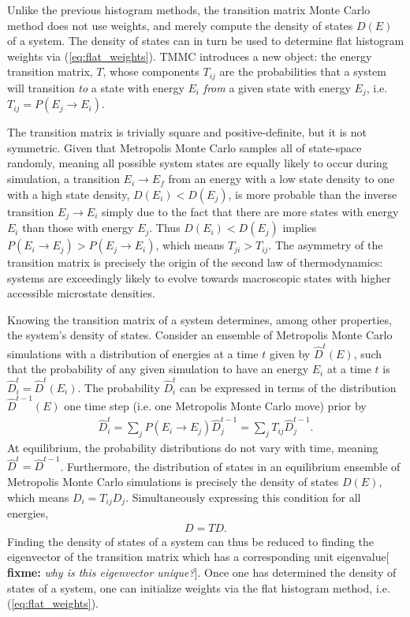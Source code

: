 \documentclass[11pt]{article}
\newcommand{\p}[1]{\left(#1\right)} %
\newcommand{\red}[1]{{\bf \color{red} #1}}
\newcommand{\fixme}[1]{[\red{fixme:} \emph{#1}]}
\begin{document}
Unlike the previous histogram methods, the transition matrix Monte
Carlo method does not use weights, and merely compute the density of
states $D\p{E}$ of a system\cite{tmmc}. The density of states can in
turn be used to determine flat histogram weights via
(\ref{eq:flat_weights}). TMMC introduces a new object: the energy
transition matrix, $T$, whose components $T_{ij}$ are the
probabilities that a system will transition {\it to} a state with
energy $E_i$ {\it from} a given state with energy $E_j$,
i.e. $T_{ij}=P\p{E_j\to E_i}$.

The transition matrix is trivially square and positive-definite, but
it is not symmetric. Given that Metropolis Monte Carlo samples all of
state-space randomly, meaning all possible system states are equally
likely to occur during simulation, a transition $E_i\to E_f$ from an
energy with a low state density to one with a high state density,
$D\p{E_i}<D\p{E_j}$, is more probable than the inverse transition
$E_j\to E_i$ simply due to the fact that there are more states with
energy $E_i$ than those with energy $E_j$. Thus $D\p{E_i}<D\p{E_j}$
implies $P\p{E_i\to E_j}>P\p{E_j\to E_i}$, which means
$T_{ji}>T_{ij}$. The asymmetry of the transition matrix is precisely
the origin of the second law of thermodynamics: systems are
exceedingly likely to evolve towards macroscopic states with higher
accessible microstate densities.

Knowing the transition matrix of a system determines, among other
properties, the system's density of states. Consider an ensemble of
Metropolis Monte Carlo simulations with a distribution of energies at
a time $t$ given by $\hat D^{t}\p{E}$, such that the probability of
any given simulation to have an energy $E_i$ at a time $t$ is $\hat
D_i^{t}=\hat D^{t}\p{E_i}$. The probability $\hat D_i^{t}$ can be
expressed in terms of the distribution $\hat D^{t-1}\p{E}$ one time
step (i.e. one Metropolis Monte Carlo move) prior by
\begin{align}
  \hat D_i^{t}=\sum_jP\p{E_i\to E_j}\hat D_j^{t-1} =\sum_j T_{ij}\hat
  D_j^{t-1}.
  \label{eq:transition_evolution}
\end{align}
At equilibrium, the probability distributions do not vary with time,
meaning $\hat D^{t}=\hat D^{t-1}$. Furthermore, the distribution of
states in an equilibrium ensemble of Metropolis Monte Carlo
simulations is precisely the density of states $D\p{E}$, which means
$D_i=T_{ij}D_j$.  Simultaneously expressing this condition for all
energies,
\begin{align}
  D=TD. \label{eq:dos_eigen}
\end{align}
Finding the density of states of a system can thus be reduced to
finding the eigenvector of the transition matrix which has a
corresponding unit eigenvalue\fixme{why is this eigenvector
  unique?}. Once one has determined the density of states of a system,
one can initialize weights via the flat histogram method,
i.e. (\ref{eq:flat_weights}).
\end{document}
